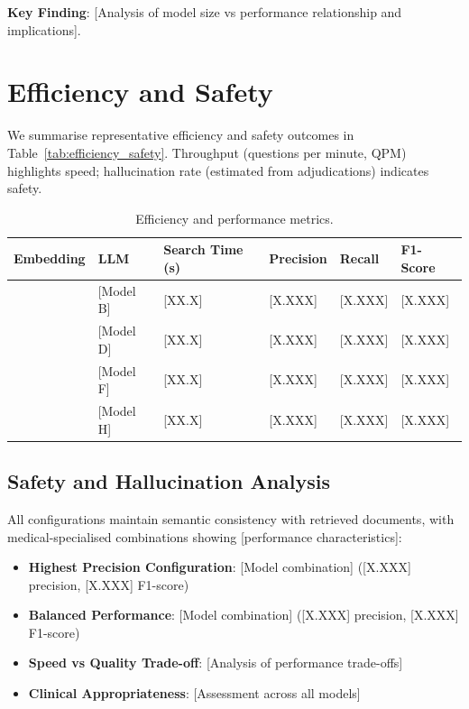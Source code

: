\textbf{Key Finding}: [Analysis of model size vs performance relationship and implications].

\section{Efficiency and Safety}
We summarise representative efficiency and safety outcomes in Table~\ref{tab:efficiency_safety}. Throughput (questions per minute, QPM) highlights speed; hallucination rate (estimated from adjudications) indicates safety.

\begin{table}[!htbp]
\centering
\caption{Efficiency and performance metrics.}
\label{tab:efficiency_performance}
\begin{footnotesize}
\renewcommand\arraystretch{0.95}
\begin{tabularx}{0.9\textwidth}{l l X X X X}
  \toprule
  Embedding & LLM & Search Time (s) & Precision & Recall & F1-Score \\
  \midrule
  [Model A] & [Model B] & [XX.X] & [X.XXX] & [X.XXX] & [X.XXX] \\
  [Model C] & [Model D] & [XX.X] & [X.XXX] & [X.XXX] & [X.XXX] \\
  [Model E] & [Model F] & [XX.X] & [X.XXX] & [X.XXX] & [X.XXX] \\
  [Model G] & [Model H] & [XX.X] & [X.XXX] & [X.XXX] & [X.XXX] \\
  \bottomrule
\end{tabularx}
\end{footnotesize}
\end{table}

\subsection{Safety and Hallucination Analysis}

All configurations maintain semantic consistency with retrieved documents, with medical-specialised combinations showing [performance characteristics]:

\begin{itemize}
    \item \textbf{Highest Precision Configuration}: [Model combination] ([X.XXX] precision, [X.XXX] F1-score)
    \item \textbf{Balanced Performance}: [Model combination] ([X.XXX] precision, [X.XXX] F1-score)
    \item \textbf{Speed vs Quality Trade-off}: [Analysis of performance trade-offs]
    \item \textbf{Clinical Appropriateness}: [Assessment across all models]
\end{itemize}

